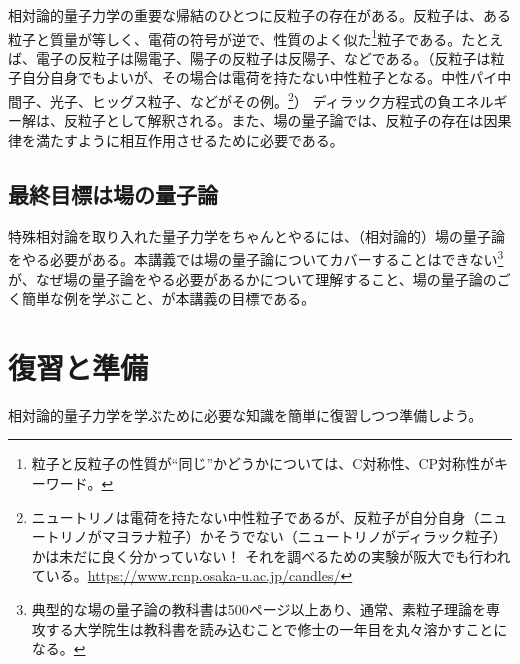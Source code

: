\documentclass[10pt,a4paper]{jarticle}
\begin{document}
相対論的量子力学の重要な帰結のひとつに反粒子の存在がある。反粒子は、ある粒子と質量が等しく、電荷の符号が逆で、性質のよく似た\footnote{粒子と反粒子の性質が``同じ''かどうかについては、C対称性、CP対称性がキーワード。}粒子である。たとえば、電子の反粒子は陽電子、陽子の反粒子は反陽子、などである。（反粒子は粒子自分自身でもよいが、その場合は電荷を持たない中性粒子となる。中性パイ中間子、光子、ヒッグス粒子、などがその例。\footnote{
ニュートリノは電荷を持たない中性粒子であるが、反粒子が自分自身（ニュートリノがマヨラナ粒子）かそうでない（ニュートリノがディラック粒子）かは未だに良く分かっていない！
それを調べるための実験が阪大でも行われている。\url{https://www.rcnp.osaka-u.ac.jp/candles/}}）
ディラック方程式の負エネルギー解は、反粒子として解釈される。また、場の量子論では、反粒子の存在は因果律を満たすように相互作用させるために必要である。

\subsection{最終目標は場の量子論}
特殊相対論を取り入れた量子力学をちゃんとやるには、（相対論的）場の量子論をやる必要がある。本講義では場の量子論についてカバーすることはできない\footnote{典型的な場の量子論の教科書は500ページ以上あり、通常、素粒子理論を専攻する大学院生は教科書を読み込むことで修士の一年目を丸々溶かすことになる。}が、なぜ場の量子論をやる必要があるかについて理解すること、場の量子論のごく簡単な例を学ぶこと、が本講義の目標である。

\section{復習と準備}
相対論的量子力学を学ぶために必要な知識を簡単に復習しつつ準備しよう。
\end{document}
